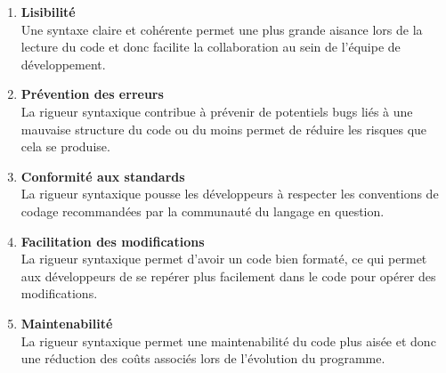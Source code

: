 \documentclass{rapport}
\begin{document}
\begin{enumerate}[listparindent=0pt, parsep=0pt]
    \item \textbf{Lisibilité}\\
    Une syntaxe claire et cohérente permet une plus grande aisance lors de la lecture du code et donc facilite la collaboration au sein de l'équipe de développement.\\
    
    \item \textbf{Prévention des erreurs}\\
    La rigueur syntaxique contribue à prévenir de potentiels bugs liés à une mauvaise structure du code ou du moins permet de réduire les risques que cela se produise.\\

    \item \textbf{Conformité aux standards}\\
    La rigueur syntaxique pousse les développeurs à respecter les conventions de codage recommandées par la communauté du langage en question.\\

    \item \textbf{Facilitation des modifications}\\
    La rigueur syntaxique permet d'avoir un code bien formaté, ce qui permet aux développeurs de se repérer plus facilement dans le code pour opérer des modifications.\\

    \item \textbf{Maintenabilité}\\
    La rigueur syntaxique permet une maintenabilité du code plus aisée et donc une réduction des coûts associés lors de l'évolution du programme.

\end{enumerate}

\newpage
\end{document}
